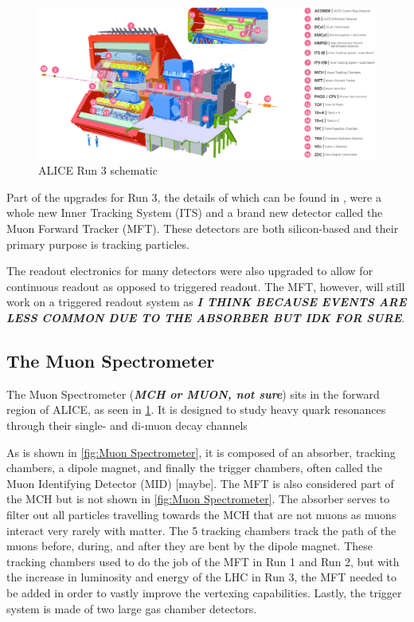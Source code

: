 \documentclass[11pt]{article}
\numberwithin{equation}{section}
\numberwithin{figure}{section}
\numberwithin{table}{section}
\begin{document}
\begin{figure}[h]
    \begin{center}
        \includegraphics[width=.8\textwidth]{Figs/ALICE_RUN3_schematic.png}
        \caption{ALICE Run 3 schematic}
        \label{fig:ALICE_Schematic}
    \end{center}
\end{figure}

Part of the upgrades for Run 3, the details of which can be found in \cite{ALICE_Upgrade_LOI}, were a whole new Inner Tracking System (ITS) and a brand new detector called the Muon Forward Tracker (MFT). These detectors are both silicon-based and their primary purpose is tracking particles. 

The readout electronics for many detectors were also upgraded to allow for continuous readout as opposed to triggered readout. The MFT, however, will still work on a triggered readout system as \textit{\textbf{I THINK BECAUSE EVENTS ARE LESS COMMON DUE TO THE ABSORBER BUT IDK FOR SURE}}.

\subsection{The Muon Spectrometer}
The Muon Spectrometer (\textit{\textbf{MCH or MUON, not sure}}) sits in the forward region of ALICE, as seen in \cref{fig:ALICE_Schematic}. It is designed to study heavy quark resonances through their single- and di-muon decay channels

As is shown in \cref{fig:Muon Spectrometer}, it is composed of an absorber, tracking chambers, a dipole magnet, and finally the trigger chambers, often called the Muon Identifying Detector (MID) [maybe]. The MFT is also considered part of the MCH but is not shown in \cref{fig:Muon Spectrometer}. The absorber serves to filter out all particles travelling towards the MCH that are not muons as muons interact very rarely with matter. The 5 tracking chambers track the path of the muons before, during, and after they are bent by the dipole magnet. These tracking chambers used to do the job of the MFT in Run 1 and Run 2, but with the increase in luminosity and energy of the LHC in Run 3, the MFT needed to be added in order to vastly improve the vertexing capabilities. Lastly, the trigger system is made of two large gas chamber detectors. 
\end{document}
